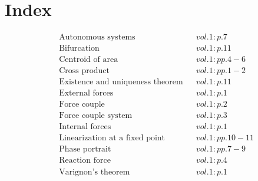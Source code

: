 \documentclass[a4paper]{article}
\begin{document}
 
\section*{Index} 
\begin{align*} 
&\text{Autonomous systems}&& vol. 1: p. 7\\
&\text{Bifurcation}&& vol. 1: p. 11\\
&\text{Centroid of area}&& vol. 1: pp. 4-6\\
&\text{Cross product}&& vol. 1: pp. 1-2\\
&\text{Existence and uniqueness theorem}&& vol. 1: p. 11\\
&\text{External forces}&& vol. 1: p. 1\\
&\text{Force couple}&& vol. 1: p. 2\\
&\text{Force couple system}&& vol. 1: p. 3\\
&\text{Internal forces}&& vol. 1: p. 1\\
&\text{Linearization at a fixed point}&& vol. 1: pp. 10-11\\
&\text{Phase portrait}&& vol. 1: pp. 7-9\\
&\text{Reaction force}&& vol. 1: p. 4\\
&\text{Varignon's theorem}&& vol. 1: p. 1\\
\end{align*} 
\end{document}
